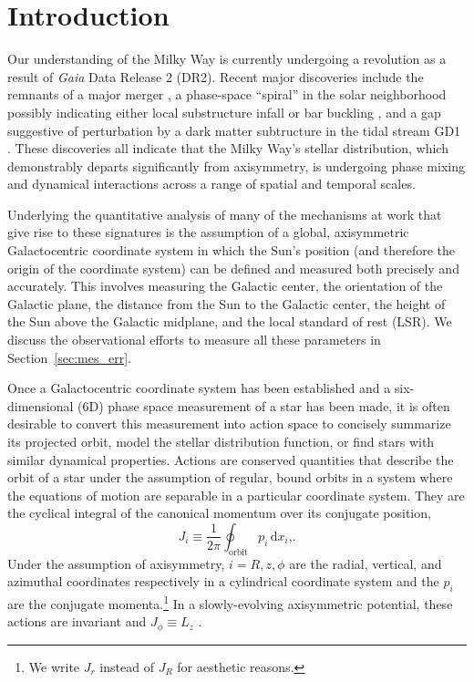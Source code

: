 \documentclass[twocolumn]{aastex62}
\newcommand{\beq}{\begin{equation}}
\newcommand{\eeq}{\end{equation}}
\begin{document}

\section{Introduction} \label{sec:intro}
Our understanding of the Milky Way is currently undergoing a revolution as a
result of {\em Gaia} Data Release 2 (DR2).  Recent major discoveries include
the remnants of a major merger \citep{2018ApJ...860L..11K,
2018Natur.563...85H, 2018arXiv180704290L, 2019MNRAS.482.3426M}, a phase-space
``spiral'' in the solar neighborhood \citep{2018Natur.561..360A} possibly
indicating either local substructure infall \citep{2018MNRAS.481.1501B,
2018arXiv180800451L} or bar buckling \citep{2018arXiv181109205K}, and a gap
suggestive of perturbation by a dark matter subtructure in the tidal stream
GD1 \citep{2018ApJ...863L..20P, 2018arXiv181103631B}. These discoveries all
indicate that the Milky Way's stellar distribution, which demonstrably departs
significantly from axisymmetry, is undergoing phase mixing and dynamical
interactions across a range of spatial and temporal scales.

Underlying the quantitative analysis of many of the mechanisms at work that
give rise to these signatures is the assumption of a global, axisymmetric
Galactocentric coordinate system \citep{2008gady.book.....B} in which the
Sun's position (and therefore the origin of the coordinate system) can be
defined and measured both precisely and accurately. This involves measuring
the Galactic center, the orientation of the Galactic plane, the distance from
the Sun to the Galactic center, the height of the Sun above the Galactic
midplane, and the local standard of rest (LSR). We discuss the observational
efforts to measure all these parameters in Section~\ref{sec:mes_err}.

Once a Galactocentric coordinate system has been established and a
six-dimensional (6D) phase space measurement of a star has been made, it is
often desirable to convert this measurement into action space to concisely
summarize its projected orbit, model the stellar distribution function, or
find stars with similar dynamical properties. Actions are conserved quantities
that describe the orbit of a star under the assumption of regular, bound
orbits in a system where the equations of motion are separable in a particular
coordinate system. They are the cyclical integral of the canonical momentum
over its conjugate position,
\beq\label{eq:actions}
J_i \equiv
\frac{1}{2\pi} \oint_{\text{orbit}}p_i\,\text{d}x_i\text{,.}
\eeq
Under the assumption of axisymmetry, $i=R,z,\phi$ are the radial, vertical,
and azimuthal coordinates respectively in a cylindrical coordinate system and
the $p_i$ are the conjugate momenta.\footnote{We write $J_r$ instead of $J_R$
for aesthetic reasons.} In a slowly-evolving axisymmetric potential, these
actions are invariant and $J_{\phi} \equiv L_z$
\citep{2008gady.book.....B,2014RvMP...86....1S}.
\end{document}
